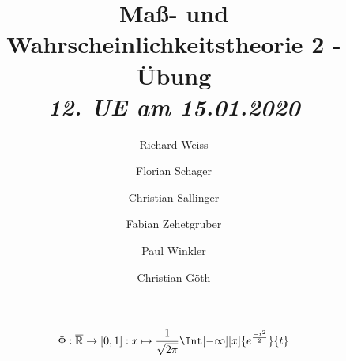 \documentclass{article}
\title
{
  Maß- und Wahrscheinlichkeitstheorie 2 - Übung \\
  \vspace{4pt}
  \normalsize
  \textit{12. UE am 15.01.2020}
}
\author
{
  Richard Weiss       \and
  Florian Schager     \and
  Christian Sallinger \and
  Fabian Zehetgruber  \and
  Paul Winkler        \and
  Christian Göth
}
\date{}
\begin{document}
\maketitle

\begin{align*}
  \Phi:
  \overline{\R} \to [0, 1]:
  x \mapsto \frac{1}{\sqrt{2 \pi}} \Int[-\infty][x]{e^\frac{-t^2}{2}}{t}
\end{align*}








\end{document}
